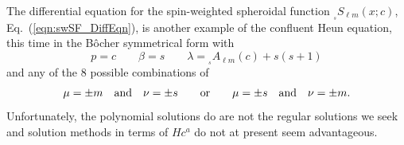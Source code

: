 \documentclass[11pt]{article}
\newcommand{\swS}[5][]{{}_{{}_{#2}}S^{#1}_{#3}(#4;#5)}
\newcommand{\scA}[4][]{{}_{{}_{#2}}A^{#1}_{#3}(#4)}
\begin{document}
The differential equation for the spin-weighted spheroidal function
$\swS{s}{\ell{m}}{x}{c}$, Eq.~(\ref{eqn:swSF_DiffEqn}), is another 
example of the confluent Heun equation, this time in the B\^{o}cher 
symmetrical form with
\begin{equation}
  p=c \qquad \beta=s \qquad \lambda=\scA{s}{\ell m}{c}+s(s+1)
\end{equation}
and any of the 8 possible combinations of
\begin{equation}
  \mu = \pm m\quad\hbox{and}\quad\nu=\pm s
  \qquad\mbox{or}\qquad \mu = \pm s\quad\hbox{and}\quad\nu=\pm m.
\end{equation}
Unfortunately, the polynomial solutions do are not the regular
solutions we seek and solution methods in terms of $Hc^{a}$ do not at
present seem advantageous.
\end{document}
